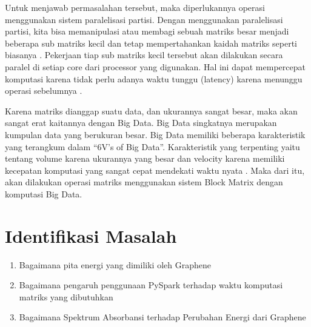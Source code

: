 \documentclass[12pt,a4paper]{report}
\begin{document}
	Untuk menjawab permasalahan tersebut, maka diperlukannya operasi menggunakan sistem paralelisasi partisi. Dengan menggunakan paralelisasi partisi, kita bisa memanipulasi atau membagi sebuah matriks besar menjadi beberapa sub matriks kecil dan tetap mempertahankan kaidah matriks seperti biasanya \cite{Ni2015}. Pekerjaan tiap sub matriks kecil tersebut akan dilakukan secara paralel di setiap core dari processor yang digunakan. Hal ini dapat mempercepat komputasi karena tidak perlu adanya waktu tunggu (latency) karena menunggu operasi sebelumnya \cite{Clayden2012}.  
	
	Karena matriks dianggap suatu data, dan ukurannya sangat besar, maka akan sangat erat kaitannya dengan Big Data. Big Data singkatnya merupakan kumpulan data yang berukuran besar. Big Data memiliki beberapa karakteristik yang terangkum dalam “6V’s of Big Data”. Karakteristik yang terpenting yaitu tentang volume karena ukurannya yang besar dan velocity karena memiliki kecepatan komputasi yang sangat cepat mendekati waktu nyata \cite{Clemons2010}. Maka dari itu, akan dilakukan operasi matriks menggunakan sistem Block Matrix dengan komputasi Big Data.


	\section{Identifikasi Masalah}
	\begin{enumerate}
	   	\item Bagaimana pita energi yang dimiliki oleh Graphene
	   	\item Bagaimana pengaruh penggunaan PySpark terhadap waktu komputasi matriks yang dibutuhkan
	   	\item Bagaimana Spektrum Absorbansi terhadap Perubahan Energi dari Graphene
	\end{enumerate}
\end{document}
